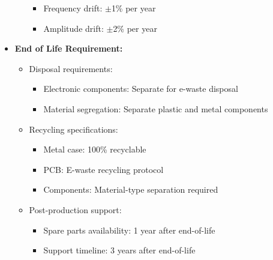 \documentclass[a4paper,12pt]{article}
\begin{document}
\begin{itemize}
\begin{itemize}
\begin{itemize}
            \item Frequency drift: $\pm$1\% per year
            \item Amplitude drift: $\pm$2\% per year
        \end{itemize}
    \end{itemize}
    \item \textbf{End of Life Requirement:}
    \begin{itemize}
        \item Disposal requirements:
        \begin{itemize}
            \item Electronic components: Separate for e-waste disposal
            \item Material segregation: Separate plastic and metal components
        \end{itemize}
        \item Recycling specifications:
        \begin{itemize}
            \item Metal case: 100\% recyclable
            \item PCB: E-waste recycling protocol
            \item Components: Material-type separation required
        \end{itemize}
        \item Post-production support:
        \begin{itemize}
            \item Spare parts availability: 1 year after end-of-life
            \item Support timeline: 3 years after end-of-life
        \end{itemize}
    \end{itemize}
\end{itemize}
\end{document}
